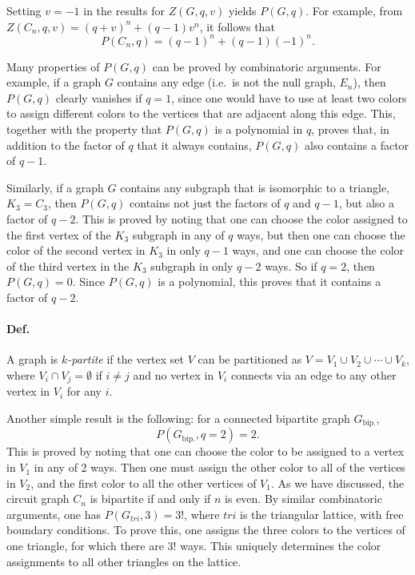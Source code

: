 Setting $v = -1$ in the results for $Z(G,q,v)$ yields $P(G,q)$. For example, from $Z(C_n,q,v) = (q+v)^n+(q-1)v^n$, it follows
that
\begin{equation}
  P(C_n,q) = (q-1)^n+(q-1)(-1)^n .
\end{equation}

Many properties of $P(G,q)$ can be proved by combinatoric arguments. For example, if a graph $G$ contains any edge (i.e.\ is
not the null graph, $E_n$), then $P(G,q)$ clearly vanishes if $q = 1$, since one would have to use at least two colors to
assign different colors to the vertices that are adjacent along this edge. This, together with the property that $P(G,q)$ is a
polynomial in $q$, proves that, in addition to the factor of $q$ that it always contains, $P(G,q)$ also contains a factor of
$q-1$.

Similarly, if a graph $G$ contains any subgraph that is isomorphic to a triangle, $K_3 = C_3$, then $P(G,q)$ contains not just
the factors of $q$ and $q-1$, but also a factor of $q-2$. This is proved by noting that one can choose the color assigned to
the first vertex of the $K_3$ subgraph in any of $q$ ways, but then one can choose the color of the second vertex in $K_3$ in
only $q-1$ ways, and one can choose the color of the third vertex in the $K_3$ subgraph in only $q-2$ ways. So if $q = 2$, then
$P(G,q) = 0$. Since $P(G,q)$ is a polynomial, this proves that it contains a factor of $q-2$.

\paragraph{Def.} A graph is \emph{$k$-partite} if the vertex set $V$ can be partitioned as $V = V_1\cup V_2\cup\cdots\cup V_k$,
where $V_i\cap V_j = \emptyset$ if $i\ne j$ and no vertex in $V_i$ connects via an edge to any other vertex in $V_i$ for any $i$.

Another simple result is the following: for a connected bipartite graph $G_{\text{bip.}}$,
\begin{equation}
  P(G_{\text{bip.}},q=2) = 2 .
\end{equation}
This is proved by noting that one can choose the color to be assigned to a vertex in $V_1$ in any of 2 ways. Then one must
assign the other color to all of the vertices in $V_2$, and the first color to all the other vertices of $V_1$. As we have
discussed, the circuit graph $C_n$ is bipartite if and only if $n$ is even. By similar combinatoric arguments, one has
$P(G_{tri},3) = 3!$, where $tri$ is the triangular lattice, with free boundary conditions. To prove this, one assigns the three
colors to the vertices of one triangle, for which there are $3!$ ways. This uniquely determines the color assignments to all
other triangles on the lattice.
